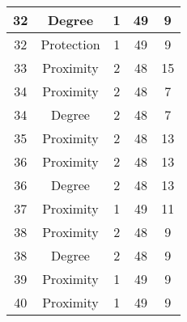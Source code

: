 \documentclass[results.tex]{subfiles}
\begin{document}
\begin{center}
\begin{tabular}{| c || c | c | c | c |}
            \hline
            32                      & Degree                       & 1                      & 49                      & 9                    \\
            \hline
            32                      & Protection                   & 1                      & 49                      & 9                    \\
            \hline
            33                      & Proximity                    & 2                      & 48                      & 15                   \\
            \hline
            34                      & Proximity                    & 2                      & 48                      & 7                    \\
            \hline
            34                      & Degree                       & 2                      & 48                      & 7                    \\
            \hline
            35                      & Proximity                    & 2                      & 48                      & 13                   \\
            \hline
            36                      & Proximity                    & 2                      & 48                      & 13                   \\
            \hline
            36                      & Degree                       & 2                      & 48                      & 13                   \\
            \hline
            37                      & Proximity                    & 1                      & 49                      & 11                   \\
            \hline
            38                      & Proximity                    & 2                      & 48                      & 9                    \\
            \hline
            38                      & Degree                       & 2                      & 48                      & 9                    \\
            \hline
            39                      & Proximity                    & 1                      & 49                      & 9                    \\
            \hline
            40                      & Proximity                    & 1                      & 49                      & 9                    \\

\end{tabular}
\end{center}
\end{document}
